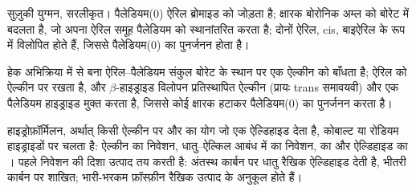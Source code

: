 \begin{omfigure}

{\small सुज़ुकी युग्मन, सरलीकृत। पैलेडियम(0) ऐरिल ब्रोमाइड को जोड़ता है; क्षारक
बोरोनिक अम्ल को बोरेट में बदलता है, जो अपना ऐरिल समूह पैलेडियम को स्थानांतरित करता है; दोनों
ऐरिल, cis, बाइऐरिल के रूप में विलोपित होते हैं, जिससे पैलेडियम(0) का पुनर्जनन होता है।}
\end{omfigure}

हेक अभिक्रिया में  से बना ऐरिल--पैलेडियम संकुल बोरेट के स्थान पर
एक ऐल्कीन को बाँधता है;  ऐरिल को ऐल्कीन पर रखता है, और
$\beta$-हाइड्राइड विलोपन प्रतिस्थापित ऐल्कीन (प्रायः trans समावयवी)
और एक पैलेडियम हाइड्राइड मुक्त करता है, जिससे कोई क्षारक  हटाकर पैलेडियम(0) का पुनर्जनन करता है।

हाइड्रोफ़ॉर्मिलन, अर्थात् किसी ऐल्कीन पर  और  का योग जो एक ऐल्डिहाइड देता है,
कोबाल्ट या रोडियम हाइड्राइडों पर चलता है: ऐल्कीन का निवेशन, धातु--ऐल्किल आबंध में  का
निवेशन,  का  और ऐल्डिहाइड का । पहले निवेशन की दिशा उत्पाद तय करती है: अंतस्थ कार्बन पर धातु
रैखिक ऐल्डिहाइड देती है, भीतरी कार्बन पर शाखित; भारी-भरकम
फ़ॉस्फ़ीन रैखिक उत्पाद के अनुकूल होते हैं।

